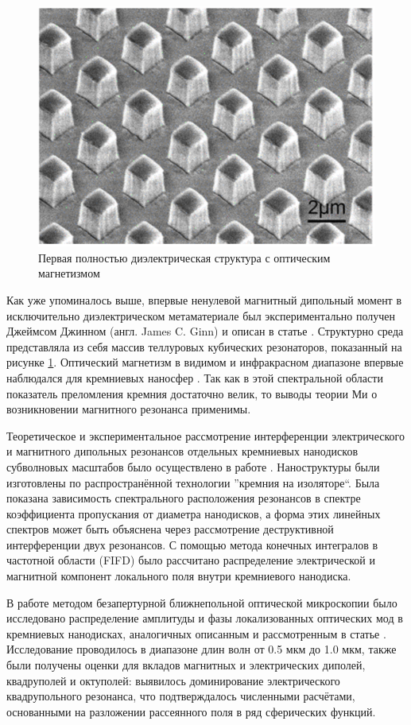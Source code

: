 \begin{figure}[h]
	\centering
	\includegraphics[width=.7\textwidth]{img/Ginn}
	\caption{Первая полностью диэлектрическая структура с оптическим магнетизмом \cite{Ginn2012}}
	\label{fig:ginn}
\end{figure}

Как уже упоминалось выше, впервые ненулевой магнитный дипольный момент в исключительно диэлектрическом метаматериале был экспериментально получен Джеймсом Джинном (англ. James C. Ginn) и описан в статье \cite{Ginn2012}. Структурно среда представляла из себя массив теллуровых кубических резонаторов, показанный на рисунке \ref{fig:ginn}. Оптический магнетизм в видимом и инфракрасном диапазоне впервые наблюдался для кремниевых наносфер \cite{Evlyukhin2012a, Kuznetsov2012}. Так как в этой спектральной области показатель преломления кремния достаточно велик, то выводы теории Ми о возникновении магнитного резонанса \cite{Zhao2009} применимы.

Теоретическое и экспериментальное рассмотрение интерференции электрического и магнитного дипольных резонансов отдельных кремниевых нанодисков субволновых масштабов было осуществлено в работе \cite{Staude2013}. Наноструктуры были изготовлены по распространённой технологии ''кремния на изоляторе``. Была показана зависимость спектрального расположения резонансов в спектре коэффициента пропускания от диаметра нанодисков, а форма этих линейных спектров может быть объяснена через рассмотрение деструктивной интерференции двух резонансов. С помощью метода конечных интегралов в частотной области (FIFD) было рассчитано распределение электрической и магнитной компонент локального поля внутри кремниевого нанодиска.

В работе \cite{Habteyes2014} методом безапертурной ближнепольной оптической микроскопии было исследовано распределение амплитуды и фазы локализованных оптических мод в кремниевых нанодисках, аналогичных описанным и рассмотренным в статье \cite{Staude2013}. Исследование проводилось в диапазоне длин волн от 0.5 мкм до 1.0 мкм, также были получены оценки для вкладов магнитных и электрических диполей, квадруполей и октуполей: выявилось доминирование электрического квадрупольного резонанса, что подтверждалось численными расчётами, основанными на разложении рассеянного поля в ряд сферических функций.

